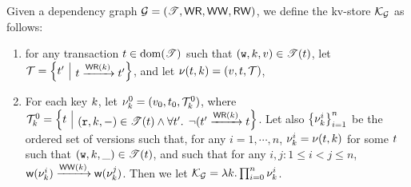 \begin{definition}
\label{def:dependency-to-kv-store}
Given a dependency graph $\mathcal{G} = (\mathscr{T}, \mathsf{WR}, \mathsf{WW}, \mathsf{RW})$, we define the kv-store $\mathcal{K}_{\mathcal{G}}$ as follows: 
\begin{enumerate}
\item for any transaction $t \in \operatorname{dom}(\mathscr{T})$ such that $(\textnormal{\texttt w}, k, v) \in \mathscr{T}(t)$, 
    let $\txidset = \Set{ \txid' }[ \txid \toEDGE{\WR(\key)} \txid']$, and let $\nu(t, k) = (v, t, \mathcal{T})$, 
\item For each key $k$, let $\nu_{k}^{0} = (v_0, t_0, \mathcal{T}_k^{0})$, where $\txidset_{k}^{0} = \Set{ \txid }[ (\otR, \key, \stub) \in 
\TtoOp{T}(\txid) \land \fora{ \txid' } \neg( \txid' \toEDGE{\WR(\key)} \txid ]$. 
Let also $\Set{ \ver_{\key}^{i} }_{i = 1}^{n}$ be the ordered set of versions such that, for any 
$i=1,\cdots,n$, $\nu_{k}^{i} = \nu(t, k)$ for some $t$ such that $(\textnormal{\texttt w}, k, \_) \in \mathscr{T}(t)$, 
and such that for any $i, j: 1 \leq i < j \leq n$, $\wtOf(\ver_{\key}^{i}) \toEDGE{\WW(\key)} \wtOf(\ver_{\key}^{j})$. 
Then we let $\mathcal{K}_{\mathcal{G}}= \lambda k. \prod_{i=0}^{n} \nu_{k}^{i}$.
\end{enumerate}
\end{definition}

